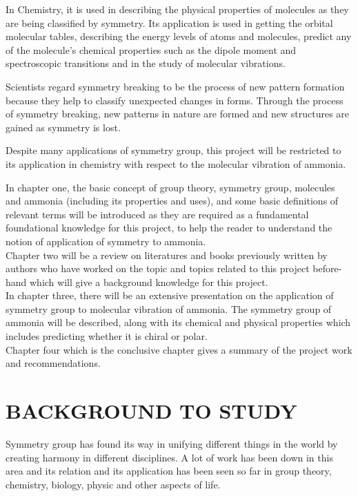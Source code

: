 \documentclass[a4paper, 12pt, openany]{report}
\begin{document}
	 In Chemistry, it is used in describing the physical properties of molecules as they are being classified by symmetry. Its application is used in getting the orbital molecular tables, describing the energy levels of atoms and molecules, predict any of the molecule's chemical properties such as the dipole moment and spectroscopic transitions and in the study of molecular vibrations.
	
	 Scientists regard symmetry breaking to be the process of new pattern \break formation because they help to classify unexpected changes in forms. Through the process of symmetry breaking, new patterns in nature are formed and new structures are  gained as symmetry is lost.
	 
	  Despite many applications of symmetry group, this project will be \break restricted to its application in chemistry with respect to the molecular \break vibration of ammonia.
	
	In chapter one, the basic concept of group theory, symmetry group, molecules and ammonia (including its properties and uses), and some \break basic definitions of relevant terms  will be introduced as they are required as a fundamental  foundational knowledge for this project, to help the reader to understand the notion of application of symmetry  to ammonia. \\	
	Chapter two will be a review on literatures and books previously written by authors who have worked  on the topic and topics related to this project before-hand which will give a background knowledge for this project.\\	
	In chapter three, there will be an extensive presentation on the application of symmetry group to molecular vibration of ammonia. The symmetry group of ammonia will be described, along with its chemical and physical properties  which includes predicting whether it is chiral or polar.\\
	Chapter four which is the conclusive chapter gives a summary of the project work and recommendations.
	
	\section{BACKGROUND TO STUDY}
		Symmetry group has found its way in unifying different things in the world by creating harmony in different disciplines. A lot of work has been down in this area and its relation and its application has been seen so far in group theory, chemistry, biology, physic and other aspects of life.
	
\end{document}
